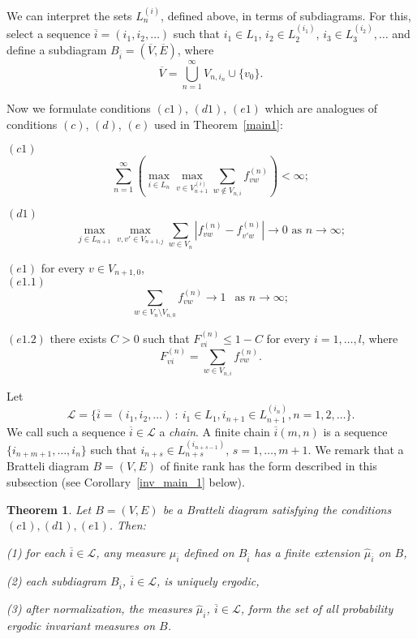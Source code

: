 \documentclass[11pt, english, reqno]{amsart}
\theoremstyle{definition}
\theoremstyle{remark}
\theoremstyle{plain}
\newtheorem{thm}[defin]{Theorem}
\def\ov{\overline}
\def\wh{\widehat}
\numberwithin{equation}{section}
\begin{document}
{We can interpret the sets $L_n^{(i)}$, defined above, in terms of
 subdiagrams. For this, select a sequence $\ov i = (i_1,i_2, \ldots)$ such
  that  $i_1 \in L_1$, $i_2 \in L_2^{(i_1)}$, $i_3 \in L_3^{(i_2)}, \ldots$
  and  define a subdiagram $B_{\ov i} = (\ov V, \ov E)$, where
  $$
  \ov V = \bigcup_{n=1}^{\infty}V_{n,i_n} \cup \{v_0\}.
$$

Now we formulate conditions $(c1)$, $(d1)$, $(e1)$ which are analogues
of conditions $(c)$, $(d)$, $(e)$ used in  Theorem~\ref{main1}:

\medskip
$(c1)$
$$
\sum_{n = 1}^{\infty} \left(\max_{i \in L_{n}} \max_{v \in V_{n+1}^{(i)}}
 \sum_{w \notin V_{n,i}} f_{vw}^{(n)}\right) < \infty;
$$

\medskip
$(d1)$
$$
\max_{j \in L_{n+1}}\max_{v,v' \in V_{n+1,j}} \sum_{w \in V_{n}}
\left|f_{vw}^{(n)} - f_{v'w}^{(n)}\right| \rightarrow 0 \mbox{ as } n \rightarrow \infty;
$$

\medskip
$(e1)$ for every $v \in V_{n+1,0}$, \\
$(e1.1)$
$$
\sum_{w \in V_n \setminus V_{n,0}} f_{vw}^{(n)} \rightarrow 1
\ \ \mbox{ as } n \rightarrow \infty;
$$

\noindent $(e1.2)$ there exists $C>0$ such that $F_{vi}^{(n)} \leq 1 - C$
for every $i = 1,\ldots,l$, where
$$
F_{vi}^{(n)} = \sum_{w \in V_{n,i}}f_{vw}^{(n)}.
$$

\medskip

 Let
 $$\mathcal{L} = \{\ov i
  = (i_1, i_2, \ldots) \ : \ i_1 \in L_1, i_{n+1} \in L_{n+1}^{(i_n)}, n = 1,2,
  \ldots\}.
  $$
  We call such a  sequence $\ov i \in   \mathcal{L}$  a \textit{chain}.
  A finite chain
  $\ov i(m,n)$ is a sequence $\{i_{n+m+1}, \ldots, i_n\}$ such that
  $i_{n+s} \in L_{n+s}^{(i_{n+s-1})}$, $s = 1,\ldots, m+1$.
We remark that a Bratteli diagram $B = (V,E)$ of finite rank has the form
 described in this subsection (see Corollary~\ref{inv_main_1} below).


\begin{thm}\label{main_gen_case}
Let $B = (V,E)$ be a Bratteli diagram satisfying the conditions $(c1),(d1),
(e1)$. Then:

(1) for each $\ov i \in \mathcal{L}$, any measure $\mu_{\ov i}$ defined on
$B_{\ov i}$ has a finite extension $\wh{\mu}_{\ov i}$ on $B$,

(2) each subdiagram $B_{\ov i}$, $\ov i \in \mathcal{L}$, is uniquely
ergodic,

(3) after normalization, the measures $\wh{\mu}_{\ov i}$, $\ov i \in
\mathcal{L}$, form the set of all probability ergodic invariant measures on
$B$.
\end{thm}

}
\end{document}
